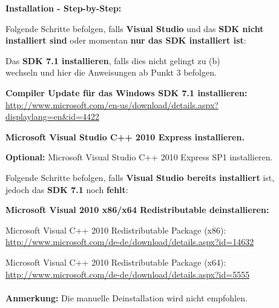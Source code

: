 \documentclass[a4paper,11pt]{article}
\begin{document}
\begin{stepbystep}
	\item \textbf{Installation - Step-by-Step:}
	\begin{stepbystep}
		\item Folgende Schritte befolgen, falls \textbf{Visual Studio} und das \textbf{SDK nicht}
		\\ \textbf{installiert sind} oder momentan \textbf{nur das SDK installiert ist}:
		\begin{stepbystep}
			\item Das \textbf{SDK 7.1 installieren}, falls dies nicht gelingt zu (b) 
			\\ wechseln und hier die Anweisungen ab Punkt 3 befolgen.
			
			\item \textbf{Compiler Update für das Windows SDK 7.1 installieren: } 
			\\ \url{http://www.microsoft.com/en-us/download/details.aspx?displaylang=en&id=4422}
		
			\item \textbf{Microsoft Visual Studio C++ 2010 Express installieren.}
			
			\item \textbf{Optional:} Microsoft Visual Studio C++ 2010 Express SP1 installieren.
			\\
		\end{stepbystep}
		
		\item Folgende Schritte befolgen, falls \textbf{Visual Studio bereits installiert} ist,
		\\ jedoch das \textbf{SDK 7.1} noch \textbf{fehlt}:
		\begin{stepbystep}
			\item \textbf{Microsoft Visual 2010 x86/x64 Redistributable deinstallieren:}
			\\
			\begin{stepbystep}
			\item Microsoft Visual C++ 2010 Redistributable Package (x86): 
			\\ \url{http://www.microsoft.com/de-de/download/details.aspx?id=14632}
			\item Microsoft Visual C++ 2010 Redistributable Package (x64): 
			\\ \url{http://www.microsoft.com/de-de/download/details.aspx?id=5555}
			\\
			\\ \textbf{Anmerkung:} Die manuelle Deinstallation wird nicht empfohlen.
			\\
			\end{stepbystep}
			

\end{stepbystep}
\end{stepbystep}
\end{stepbystep}
\end{document}
